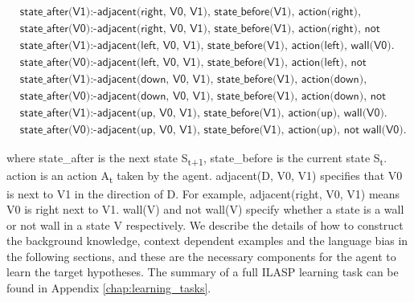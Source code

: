 \begin{equation}
\begin{split}
&\textsf{state\_after(V1):-adjacent(right, V0, V1), state\_before(V1), action(right), wall(V0).}\\
&\textsf{state\_after(V0):-adjacent(right, V0, V1), state\_before(V1), action(right), not wall(V0).}\\
&\textsf{state\_after(V1):-adjacent(left, V0, V1), state\_before(V1), action(left), wall(V0).}\\
&\textsf{state\_after(V0):-adjacent(left, V0, V1), state\_before(V1), action(left), not wall(V0).}\\
&\textsf{state\_after(V1):-adjacent(down, V0, V1), state\_before(V1), action(down), wall(V0).}\\
&\textsf{state\_after(V0):-adjacent(down, V0, V1), state\_before(V1), action(down), not wall(V0).}\\
&\textsf{state\_after(V1):-adjacent(up, V0, V1), state\_before(V1),  action(up), wall(V0).}\\
&\textsf{state\_after(V0):-adjacent(up, V0, V1), state\_before(V1), action(up), not wall(V0).}
\end{split}
\label{target_hypothesis}
\end{equation}

where \textsf{state\_after} is the next state S\textsubscript{t+1}, \textsf{state\_before} is the current state S\textsubscript{t}. \textsf{action} is an action A\textsubscript{t} taken by the agent.
\textsf{adjacent(D, V0, V1)} specifies that V0 is next to V1 in the direction of D. For example, \textsf{adjacent(right, V0, V1)} means V0 is right next to V1. 
\textsf{wall(V)} and \textsf{not wall(V)} specify whether a state is a wall or not wall in a state V respectively.
We describe the details of how to construct the background knowledge, context dependent examples and the language bias in the following sections, and these are the necessary components for the agent to learn the target hypotheses.
The summary of a full ILASP learning task can be found in Appendix \ref{chap:learning_tasks}.


